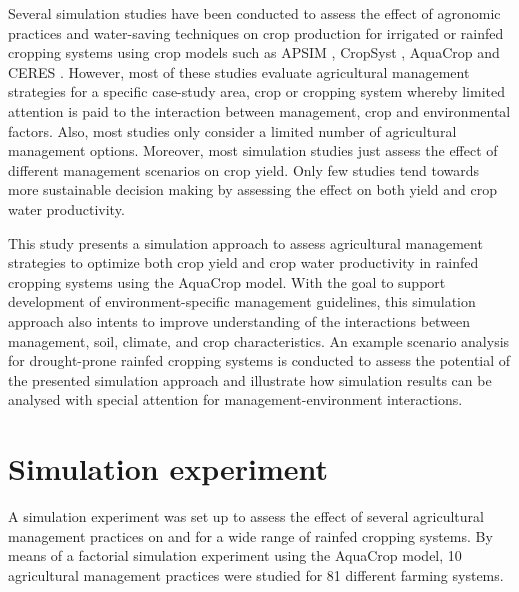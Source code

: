 Several simulation studies have been conducted to assess the effect of agronomic practices and water-saving techniques on crop production for irrigated or rainfed cropping systems using crop models such as APSIM \parencite[e.g.][]{akponikpe2010, kahinda2007}, CropSyst \parencite[e.g.][]{jalota2010, lehmann2013}, AquaCrop \parencite[e.g.][]{abrha2012, biazin2012, shrestha2013} and CERES \parencite[e.g.][]{he2012, rinaldi2004, timsina2008}. However, most of these studies evaluate agricultural management strategies for a specific case-study area, crop or cropping system whereby limited attention is paid to the interaction between management, crop and environmental factors. Also, most studies only consider a limited number of agricultural management options. Moreover, most simulation studies just assess the effect of different management scenarios on crop yield. Only few studies \parencite{arora2006, biazin2012,jalota2010, kahinda2007,shrestha2013, timsina2008} tend towards more sustainable decision making by assessing the effect on both yield and crop water productivity. 

This study presents a simulation approach to assess agricultural management strategies to optimize both crop yield and crop water productivity in rainfed cropping systems using the AquaCrop model. With the goal to support development of environment-specific management guidelines, this simulation approach also intents to improve understanding of the interactions between management, soil, climate, and crop characteristics. An example scenario analysis for drought-prone rainfed cropping systems is conducted to assess the potential of the presented simulation approach and illustrate how simulation results can be analysed with special attention for management-environment interactions. 

\section{Simulation experiment}
A simulation experiment was set up to assess the effect of several agricultural management practices on \Y and \WPET for a wide range of rainfed cropping systems. By means of a factorial simulation experiment using the AquaCrop model, 10 agricultural management practices were studied for 81 different farming systems. 

